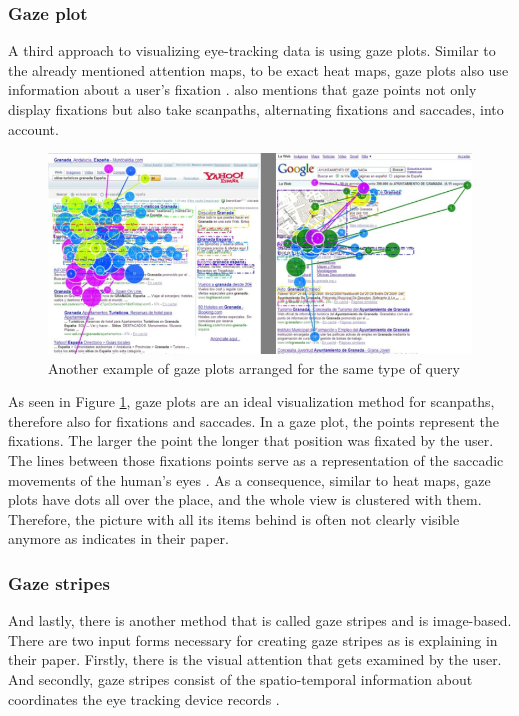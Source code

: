 \subsubsection{Gaze plot}
A third approach to visualizing eye-tracking data is using gaze plots. Similar to the already mentioned attention maps, to be exact heat maps, gaze plots also use information about a user's fixation \autocite[]{kurzhals2016gaze}. \textcite[]{kurzhals2016gaze} also mentions that gaze points not only display fixations but also take scanpaths, alternating fixations and saccades, into account. 

\begin{figure}[!ht]
    \centering
    \includegraphics[width=1\linewidth]{images/GazePlot_gonzalez2011different.png}
    \caption{
       Another example of gaze plots arranged for the same type of query \autocite[12]{gonzalez2011different}
    }
    \label{figure:GazePlot}
\end{figure}

As seen in Figure \ref{figure:GazePlot}, gaze plots are an ideal visualization method for scanpaths, therefore also for fixations and saccades. In a gaze plot, the points represent the fixations. The larger the point the longer that position was fixated by the user. The lines between those fixations points serve as a representation of the saccadic movements of the human's eyes \autocite[]{djamasbi2014eye}.
As a consequence, similar to heat maps, gaze plots have dots all over the place, and the whole view is clustered with them. Therefore, the picture with all its items behind is often not clearly visible anymore as \textcite[]{djamasbi2014eye} indicates in their paper.

\subsubsection{Gaze stripes}
And lastly, there is another method that is called gaze stripes and is image-based. There are two input forms necessary for creating gaze stripes as \textcite{kurzhals2016gaze} is explaining in their paper. Firstly, there is the visual attention that gets examined by the user. And secondly, gaze stripes consist of the spatio-temporal information about coordinates the eye tracking device records \autocite{kurzhals2016gaze}.

